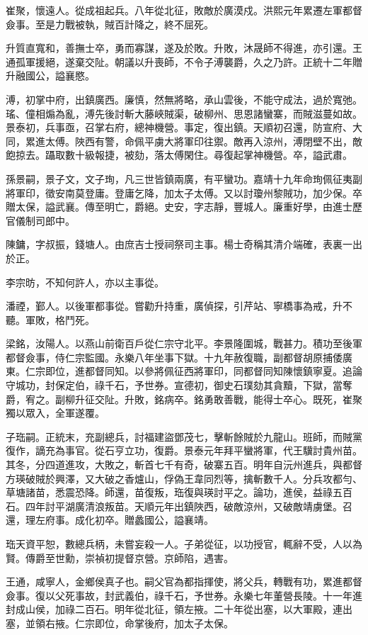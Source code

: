 \begin{pinyinscope}
崔聚，懷遠人。從成祖起兵。八年從北征，敗敵於廣漠戍。洪熙元年累遷左軍都督僉事。至是力戰被執，賊百計降之，終不屈死。

升質直寬和，善撫士卒，勇而寡謀，遂及於敗。升敗，沐晟師不得進，亦引還。王通孤軍援絕，遂棄交阯。朝議以升喪師，不令子溥襲爵，久之乃許。正統十二年贈升融國公，謚襄愍。

溥，初掌中府，出鎮廣西。廉慎，然無將略，承山雲後，不能守成法，過於寬弛。瑤、僮相煽為亂，溥先後討斬大藤峽賊渠，破柳州、思恩諸蠻寨，而賊滋蔓如故。景泰初，兵事亟，召掌右府，總神機營。事定，復出鎮。天順初召還，防宣府、大同，累進太傅。陜西有警，命佩平虜大將軍印往禦。敵再入涼州，溥閉壁不出，敵飽掠去。躡取數十級報捷，被劾，落太傅閑住。尋復起掌神機營。卒，謚武肅。

孫景嗣，景子文，文子珣，凡三世皆鎮兩廣，有平蠻功。嘉靖十九年命珣佩征夷副將軍印，徵安南莫登庸。登庸乞降，加太子太傅。又以討瓊州黎賊功，加少保。卒贈太保，謚武襄。傳至明亡，爵絕。史安，字志靜，豐城人。廉重好學，由進士歷官儀制司郎中。

陳鏞，字叔振，錢塘人。由庶吉士授祠祭司主事。楊士奇稱其清介端確，表裏一出於正。

李宗昉，不知何許人，亦以主事從。

潘禋，鄞人。以後軍都事從。嘗勸升持重，廣偵探，引芹站、寧橋事為戒，升不聽。軍敗，格鬥死。

梁銘，汝陽人。以燕山前衛百戶從仁宗守北平。李景隆圍城，戰甚力。積功至後軍都督僉事，侍仁宗監國。永樂八年坐事下獄。十九年赦復職，副都督胡原捕倭廣東。仁宗即位，進都督同知。以參將佩征西將軍印，同都督同知陳懷鎮寧夏。追論守城功，封保定伯，祿千石，予世券。宣德初，御史石璞劾其貪黷，下獄，當奪爵，宥之。副柳升征交阯。升敗，銘病卒。銘勇敢善戰，能得士卒心。既死，崔聚獨以眾入，全軍遂覆。

子珤嗣。正統末，充副總兵，討福建盜鄧茂七，擊斬餘賊於九龍山。班師，而賊黨復作，謫充為事官。從石亨立功，復爵。景泰元年拜平蠻將軍，代王驥討貴州苗。其冬，分四道進攻，大敗之，斬首七千有奇，破寨五百。明年自沅州進兵，與都督方瑛破賊於興澤，又大破之香爐山，俘偽王韋同烈等，擒斬數千人。分兵攻都勻、草塘諸苗，悉震恐降。師還，苗復叛，珤復與瑛討平之。論功，進侯，益祿五百石。四年討平湖廣清浪叛苗。天順元年出鎮陜西，破敵涼州，又破敵靖虜堡。召還，理左府事。成化初卒。贈蠡國公，謚襄靖。

珤天資平恕，數總兵柄，未嘗妄殺一人。子弟從征，以功授官，輒辭不受，人以為賢。傳爵至世勳，崇禎初提督京營。京師陷，遇害。

王通，咸寧人，金鄉侯真子也。嗣父官為都指揮使，將父兵，轉戰有功，累進都督僉事。復以父死事故，封武義伯，祿千石，予世券。永樂七年董營長陵。十一年進封成山侯，加祿二百石。明年從北征，領左掖。二十年從出塞，以大軍殿，連出塞，並領右掖。仁宗即位，命掌後府，加太子太保。


\end{pinyinscope}
